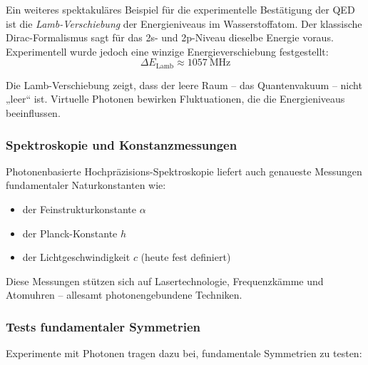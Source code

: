 Ein weiteres spektakuläres Beispiel für die experimentelle Bestätigung der QED ist die \emph{Lamb-Verschiebung} der Energieniveaus im Wasserstoffatom. Der klassische Dirac-Formalismus sagt für das 2s- und 2p-Niveau dieselbe Energie voraus. Experimentell wurde jedoch eine winzige Energieverschiebung festgestellt:
\[
\Delta E_\text{Lamb} \approx \SI{1057}{\mega\hertz}
\]
\vspace{0.5em}
\begin{tcolorbox}[didaktikbox,title=Warum ist das wichtig?]
	\label{box:Warum ist wichtig}
	Die Lamb-Verschiebung zeigt, dass der leere Raum – das Quantenvakuum – nicht „leer“ ist. Virtuelle Photonen bewirken Fluktuationen, die die Energieniveaus beeinflussen.
\end{tcolorbox}
\subsubsection{Spektroskopie und Konstanzmessungen}

Photonenbasierte Hochpräzisions-Spektroskopie liefert auch genaueste Messungen fundamentaler Naturkonstanten wie:

\begin{itemize}
	\item der Feinstrukturkonstante $\alpha$
	\item der Planck-Konstante $h$
	\item der Lichtgeschwindigkeit $c$ (heute fest definiert)
\end{itemize}

Diese Messungen stützen sich auf Lasertechnologie, Frequenzkämme und Atomuhren – allesamt photonengebundene Techniken.

\subsubsection{Tests fundamentaler Symmetrien}

Experimente mit Photonen tragen dazu bei, fundamentale Symmetrien zu testen:

